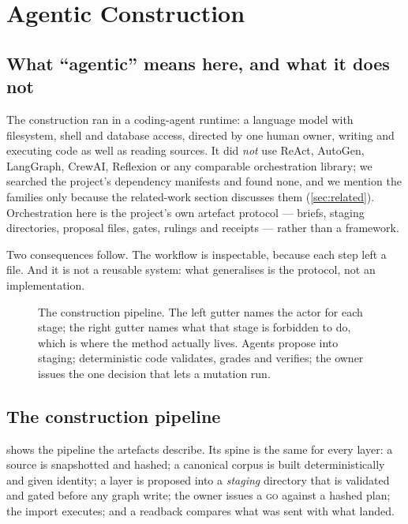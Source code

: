 \section{Agentic Construction}
\label{sec:agentic}

\subsection{What ``agentic'' means here, and what it does not}

The construction ran in a coding-agent runtime: a language model with filesystem,
shell and database access, directed by one human owner, writing and executing code as
well as reading sources. It did \emph{not} use ReAct, AutoGen, LangGraph, CrewAI,
Reflexion or any comparable orchestration library; we searched the project's
dependency manifests and found none, and we mention the families only because the
related-work section discusses them (\cref{sec:related}). Orchestration here is the
project's own artefact protocol --- briefs, staging directories, proposal files,
gates, rulings and receipts --- rather than a framework.

Two consequences follow. The workflow is inspectable, because each step left a file.
And it is not a reusable system: what generalises is the protocol, not an
implementation.

\begin{figure}[tbp]
\centering
\resizebox{0.86\textwidth}{!}{}
\caption{The construction pipeline. The left gutter names the actor for each stage;
the right gutter names what that stage is forbidden to do, which is where the
method actually lives. Agents propose into staging; deterministic code validates,
grades and verifies; the owner issues the one decision that lets a mutation run.}
\label{fig:pipeline}
\end{figure}

\subsection{The construction pipeline}

 shows the pipeline the artefacts describe. Its spine is the same
for every layer: a source is snapshotted and hashed; a canonical corpus is built
deterministically and given identity; a layer is proposed into a \emph{staging}
directory that is validated and gated before any graph write; the owner issues a
\textsc{go} against a hashed plan; the import executes; and a readback compares what
was sent with what landed.

